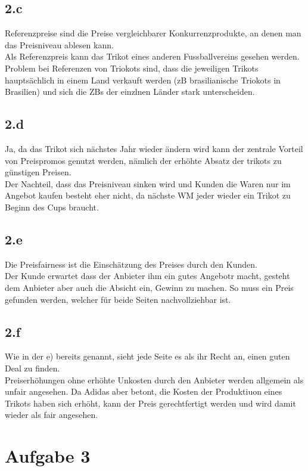 \subsection{2.c}
    Referenzpreise sind die Preise vergleichbarer Konkurrenzprodukte, an denen man das Preisniveau ablesen kann. \\
    Als Referenzpreis kann das Trikot eines anderen Fussballvereins gesehen werden. Problem bei Referenzen von Triokots sind, dass die jeweiligen Trikots hauptsächlich in einem Land verkauft werden
    (zB brasilianische Triokots in Brasilien) und sich die ZBs der einzlnen Länder stark unterscheiden.

\subsection{2.d}
    Ja, da das Trikot sich nächstes Jahr wieder ändern wird kann der zentrale Vorteil von Preispromos genutzt werden, nämlich der erhöhte Absatz der trikots zu günstigen Preisen. \\
    Der Nachteil, dass das Preisniveau sinken wird und Kunden die Waren nur im Angebot kaufen besteht eher nicht, da nächste WM jeder wieder ein Trikot zu Beginn des Cups braucht.

\subsection{2.e}
    Die Preisfairness ist die Einschätzung des Preises durch den Kunden. \\
    Der Kunde erwartet dass der Anbieter ihm ein gutes Angebotr macht, gesteht dem Anbieter aber auch die Absicht ein, 
    Gewinn zu machen. So muss ein Preis gefunden werden, welcher für beide Seiten nachvollziehbar ist.

\subsection{2.f}
    Wie in der e) bereits genannt, sieht jede Seite es als ihr Recht an, einen guten Deal zu finden. \\
    Preiserhöhungen ohne erhöhte Unkosten durch den Anbieter werden allgemein als unfair angesehen. 
    Da Adidas aber betont, die Kosten der Produktiuon eines Trikots haben sich erhöht, 
    kann der Preis gerechtfertigt werden und wird damit wieder als fair angesehen.



\section{Aufgabe 3}
